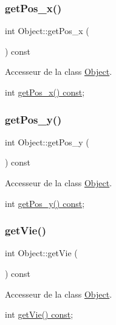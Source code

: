 \subsubsection{\texorpdfstring{get\+Pos\+\_\+x()}{getPos\_x()}}
{\footnotesize\ttfamily int Object\+::get\+Pos\+\_\+x (\begin{DoxyParamCaption}{ }\end{DoxyParamCaption}) const}



Accesseur de la class \hyperlink{class_object}{Object}. 

int \hyperlink{class_object_ad7dcd5f1f45ce373c6e57bae5d1aebec}{get\+Pos\+\_\+x() const}; \mbox{\label{class_object_a74b891ac92f211e8d8f9fd09d7822ec4}} 
\subsubsection{\texorpdfstring{get\+Pos\+\_\+y()}{getPos\_y()}}
{\footnotesize\ttfamily int Object\+::get\+Pos\+\_\+y (\begin{DoxyParamCaption}{ }\end{DoxyParamCaption}) const}



Accesseur de la class \hyperlink{class_object}{Object}. 

int \hyperlink{class_object_a74b891ac92f211e8d8f9fd09d7822ec4}{get\+Pos\+\_\+y() const}; \mbox{\label{class_object_a334099b7bd5ecf8515a1e8f3d96ebba9}} 
\subsubsection{\texorpdfstring{get\+Vie()}{getVie()}}
{\footnotesize\ttfamily int Object\+::get\+Vie (\begin{DoxyParamCaption}{ }\end{DoxyParamCaption}) const}



Accesseur de la class \hyperlink{class_object}{Object}. 

int \hyperlink{class_object_a334099b7bd5ecf8515a1e8f3d96ebba9}{get\+Vie() const}; \mbox{\label{class_object_a98f9245de6001ab13932531b047ba595}} 
